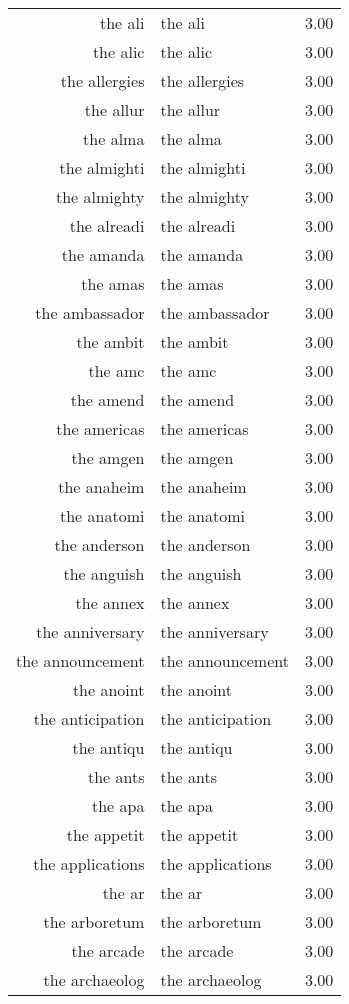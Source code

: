 \begin{table}[ht]
\begin{tabular}{rlr}
  the ali & the ali & 3.00 \\ 
  the alic & the alic & 3.00 \\ 
  the allergies & the allergies & 3.00 \\ 
  the allur & the allur & 3.00 \\ 
  the alma & the alma & 3.00 \\ 
  the almighti & the almighti & 3.00 \\ 
  the almighty & the almighty & 3.00 \\ 
  the alreadi & the alreadi & 3.00 \\ 
  the amanda & the amanda & 3.00 \\ 
  the amas & the amas & 3.00 \\ 
  the ambassador & the ambassador & 3.00 \\ 
  the ambit & the ambit & 3.00 \\ 
  the amc & the amc & 3.00 \\ 
  the amend & the amend & 3.00 \\ 
  the americas & the americas & 3.00 \\ 
  the amgen & the amgen & 3.00 \\ 
  the anaheim & the anaheim & 3.00 \\ 
  the anatomi & the anatomi & 3.00 \\ 
  the anderson & the anderson & 3.00 \\ 
  the anguish & the anguish & 3.00 \\ 
  the annex & the annex & 3.00 \\ 
  the anniversary & the anniversary & 3.00 \\ 
  the announcement & the announcement & 3.00 \\ 
  the anoint & the anoint & 3.00 \\ 
  the anticipation & the anticipation & 3.00 \\ 
  the antiqu & the antiqu & 3.00 \\ 
  the ants & the ants & 3.00 \\ 
  the apa & the apa & 3.00 \\ 
  the appetit & the appetit & 3.00 \\ 
  the applications & the applications & 3.00 \\ 
  the ar & the ar & 3.00 \\ 
  the arboretum & the arboretum & 3.00 \\ 
  the arcade & the arcade & 3.00 \\ 
  the archaeolog & the archaeolog & 3.00 \\ 

\end{tabular}
\end{table}
